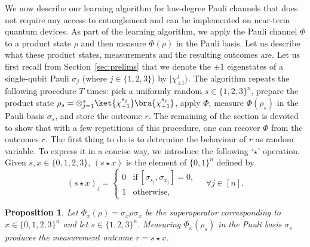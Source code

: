 \documentclass[11pt]{article}
\theoremstyle{plain}
\newtheorem{proposition}[theorem]{Proposition}
\theoremstyle{plain}
\theoremstyle{definition}
\theoremstyle{remark}
\theoremstyle{named}
\begin{document}
We now describe our learning algorithm for low-degree Pauli channels that does not require any access to entanglement and can be implemented on near-term quantum devices. As part of the learning algorithm, we apply the Pauli channel $\Phi$ to a product state $\rho$ and then measure $\Phi(\rho)$ in the Pauli basis. Let us describe what these product states, measurements and the resulting outcomes are. Let us first recall from Section~\ref{sec:prelims} that we denote the $\pm 1$ eigenstates of a single-qubit Pauli $\sigma_j$ (where $j \in \{1,2,3\}$) by $|\chi_{\pm 1}^{j}\rangle$. The algorithm repeats the following procedure $T$ times: pick a uniformly random $s
\in \{1,2,3\}^n$, prepare the product state $\rho_s = \otimes_{j=1}^s \ket{\chi_{+1}^{s_j}}\bra{\chi_{+1}^{s_j}}$, apply $\Phi$, measure $\Phi(\rho_s)$ in the Pauli basis $\sigma_s$, and store the outcome $r$. The remaining of the section is devoted to show that with a few repetitions of this procedure, one can recover $\Phi$ from the outcomes $r$. The first thing to do is to determine the behaviour of $r$ as random variable. To express it in a concise way, we introduce the following `$\star$' operation. Given $s,x\in\{0,1,2,3\}$, $(s\star x)$ is the element of $\{0,1\}^n$ defined by 
\begin{equation}\label{eq:stardefinition}
    (s\star x)_j=\left\{\begin{array}{ll}
         0 &
        \mathrm{if}\ [\sigma_{s_j},\sigma_{x_j}]=0,  \\
         1 & \mathrm{otherwise},
    \end{array}\right.
    \quad \forall j \in [n].
\end{equation}




\begin{proposition}
Let $\Phi_x(\rho) = \sigma_x \rho \sigma_x$ be the superoperator corresponding to $x \in \{0,1,2,3\}^n$ and let $s\in \{1,2,3\}^n.$ Measuring $\Phi_x(\rho_s)$ in the Pauli basis $\sigma_s$ produces the measurement outcome $r = s \star x$. 
\label{prop:outcomes_queries_pauli_channel}
\end{proposition}
\end{document}
